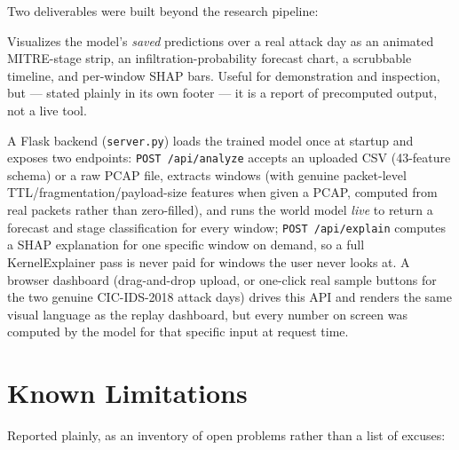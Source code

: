 \documentclass[11pt]{article}
\newcommand{\code}[1]{\texttt{#1}}
\begin{document}
Two deliverables were built beyond the research pipeline:

\begin{description}[leftmargin=1.5em,style=nextline]
  \item[A replay dashboard.] Visualizes the model's \emph{saved} predictions over a real attack
  day as an animated MITRE-stage strip, an infiltration-probability forecast chart, a scrubbable
  timeline, and per-window SHAP bars. Useful for demonstration and inspection, but --- stated
  plainly in its own footer --- it is a report of precomputed output, not a live tool.
  \item[A live-inference server (the actual PS deliverable).] A Flask backend (\code{server.py})
  loads the trained model once at startup and exposes two endpoints: \code{POST /api/analyze}
  accepts an uploaded CSV (43-feature schema) or a raw PCAP file, extracts windows (with genuine
  packet-level TTL/fragmentation/payload-size features when given a PCAP, computed from real
  packets rather than zero-filled), and runs the world model \emph{live} to return a forecast and
  stage classification for every window; \code{POST /api/explain} computes a SHAP explanation for
  one specific window on demand, so a full KernelExplainer pass is never paid for windows the
  user never looks at. A browser dashboard (drag-and-drop upload, or one-click real sample
  buttons for the two genuine CIC-IDS-2018 attack days) drives this API and renders the same
  visual language as the replay dashboard, but every number on screen was computed by the model
  for that specific input at request time.
\end{description}

\section{Known Limitations}
\label{sec:limitations}

Reported plainly, as an inventory of open problems rather than a list of excuses:
\end{document}
